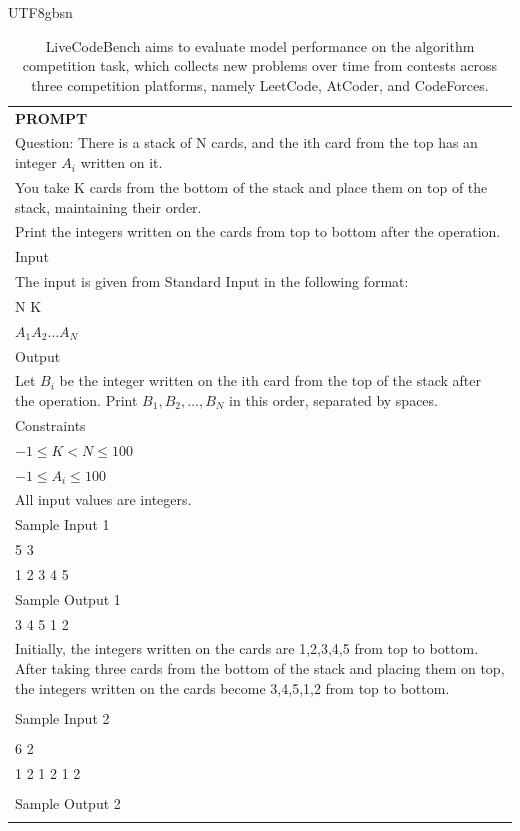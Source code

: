 \documentclass[11pt, a4paper, logo, copyright, nonumbering]{deepseek}
\renewcommand{\leq}{\leqslant}
\begin{document}
\begin{CJK*}{UTF8}{gbsn}
\begin{table}[h]
    \centering \small
        \caption{LiveCodeBench aims to evaluate model performance on the algorithm competition task, which collects new problems over time from contests across three competition platforms, namely LeetCode, AtCoder, and CodeForces. }
    \label{tab:lcb_eval_format_example}
    \begin{tabular}{p{}}
    \hline
    \textbf{PROMPT}\\
Question:
There is a stack of N cards, and the i\-th card from the top has an integer $A_i$ written on it. \\
You take K cards from the bottom of the stack and place them on top of the stack, maintaining their order. \\
Print the integers written on the cards from top to bottom after the operation. \\
Input\\
The input is given from Standard Input in the following format:\\
N K\\
$A_1 A_2 \ldots A_N$\\
Output\\
Let $B_i$ be the integer written on the i\-th card from the top of the stack after the operation. Print $B_1,B_2,\ldots,B_N$ in this order, separated by spaces.\\
Constraints\\
$-1 \leq K < N \leq 100$\\
$-1 \leq A_i \leq 100$\\
All input values are integers.\\
Sample Input 1\\
5 3 \\
1 2 3 4 5 \\
Sample Output 1 \\
3 4 5 1 2\\
Initially, the integers written on the cards are 1,2,3,4,5 from top to bottom.
After taking three cards from the bottom of the stack and placing them on top, the integers written on the cards become 3,4,5,1,2 from top to bottom.\\
\\
Sample Input 2\\
\\
6 2\\
1 2 1 2 1 2\\
\\
Sample Output 2\\
\\

\end{tabular}
\end{table}
\end{CJK*}
\end{document}
